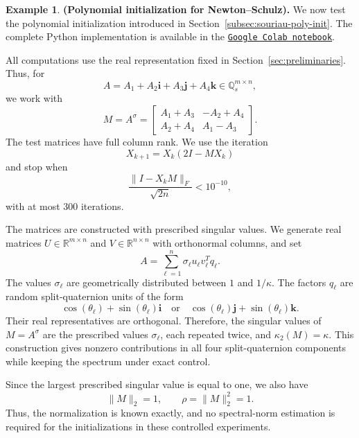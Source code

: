 \documentclass[12pt,a4paper]{article}
\theoremstyle{plain}
\theoremstyle{definition}
\newtheorem{example}[theorem]{Example}
\theoremstyle{remark}
\begin{document}
\begin{example}\label{subsec:souriau_initialization_experiments} \textbf{(Polynomial initialization for Newton--Schulz).}
We now test the polynomial initialization introduced in Section~\ref{subsec:souriau-poly-init}. 
The complete Python implementation is available in  the \href{https://colab.research.google.com/drive/1faZlKppRoyZSKIZaMydV04vxqeFIKW4P?usp=sharing} {\texttt{Google Colab notebook}}.



All computations use the real representation fixed in Section~\ref{sec:preliminaries}. Thus, for
\[
    A=A_1+A_2\mathbf{i}+A_3\mathbf{j}+A_4\mathbf{k} \in\mathbb{Q}_s^{m\times n},
\]
we work with
\[
    M=A^\sigma = \begin{bmatrix}
    A_1+A_3 & -A_2+A_4\\
    A_2+A_4 & A_1-A_3
    \end{bmatrix}.
\]
The test matrices have full column rank. We use the iteration
\[
    X_{k+1}=X_k(2I-MX_k)
\]
and stop when
\[
    \frac{\|I-X_kM\|_F}{\sqrt{2n}}<10^{-10},
\]
with at most \(300\) iterations.

The matrices are constructed with prescribed singular values. We generate real matrices \(U\in\mathbb{R}^{m\times n}\) and \(V\in\mathbb{R}^{n\times n}\) with orthonormal columns, and set
\[
    A = \sum_{\ell=1}^{n} \sigma_\ell u_\ell v_\ell^T q_\ell.
\]
The values \(\sigma_\ell\) are geometrically distributed between \(1\) and \(1/\kappa\). The factors \(q_\ell\) are random split-quaternion units of the
form
\[
    \cos(\theta_\ell)+\sin(\theta_\ell)\mathbf{i} \quad\text{or}\quad \cos(\theta_\ell)\mathbf{j}+\sin(\theta_\ell)\mathbf{k}.
\]
Their real representatives are orthogonal. Therefore, the singular values of $M=A^\sigma$
are the prescribed values \(\sigma_\ell\), each repeated twice, and
$\kappa_2(M)=\kappa.$
This construction gives nonzero contributions in all four split-quaternion components while keeping the spectrum under exact control.

Since the largest prescribed singular value is equal to one, we also have
\[
    \|M\|_2=1, \qquad \rho=\|M\|_2^2=1.
\]
Thus, the normalization is known exactly, and no spectral-norm estimation is required for the initializations in these controlled experiments.


\end{example}
\end{document}
